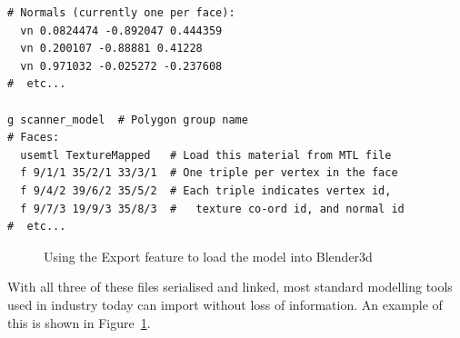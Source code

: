 \documentclass[a4paper,10pt]{article}
\begin{document}
\begin{itemize}
{\begin{verbatim}
# Normals (currently one per face):
  vn 0.0824474 -0.892047 0.444359
  vn 0.200107 -0.88881 0.41228
  vn 0.971032 -0.025272 -0.237608
#  etc...

g scanner_model  # Polygon group name
# Faces:
  usemtl TextureMapped   # Load this material from MTL file
  f 9/1/1 35/2/1 33/3/1  # One triple per vertex in the face
  f 9/4/2 39/6/2 35/5/2  # Each triple indicates vertex id,
  f 9/7/3 19/9/3 35/8/3  #   texture co-ord id, and normal id
#  etc...
\end{verbatim}

\begin{figure}
  \begin{center}
  \end{center}
  \caption{Using the Export feature to load the model into Blender3d}
  \label{blender}
\end{figure}

With all three of these files serialised and linked, most standard modelling tools used in industry today can import without loss of information. An example of this is shown in Figure~\ref{blender}.}
\end{itemize}
\end{document}
